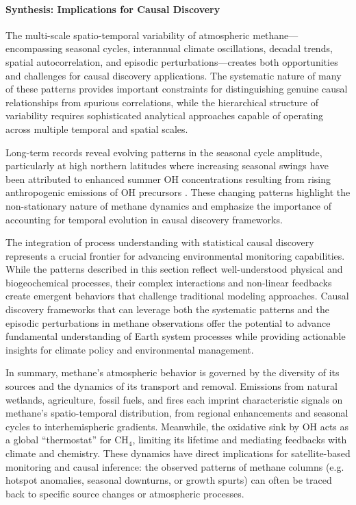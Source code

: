 \paragraph{Synthesis: Implications for Causal Discovery}

The multi-scale spatio-temporal variability of atmospheric methane—encompassing seasonal cycles, interannual climate oscillations, decadal trends, spatial autocorrelation, and episodic perturbations—creates both opportunities and challenges for causal discovery applications. The systematic nature of many of these patterns provides important constraints for distinguishing genuine causal relationships from spurious correlations, while the hierarchical structure of variability requires sophisticated analytical approaches capable of operating across multiple temporal and spatial scales.

Long-term records reveal evolving patterns in the seasonal cycle amplitude, particularly at high northern latitudes where increasing seasonal swings have been attributed to enhanced summer OH concentrations resulting from rising anthropogenic emissions of OH precursors \cite{Karoff2023}. These changing patterns highlight the non-stationary nature of methane dynamics and emphasize the importance of accounting for temporal evolution in causal discovery frameworks.

The integration of process understanding with statistical causal discovery represents a crucial frontier for advancing environmental monitoring capabilities. While the patterns described in this section reflect well-understood physical and biogeochemical processes, their complex interactions and non-linear feedbacks create emergent behaviors that challenge traditional modeling approaches. Causal discovery frameworks that can leverage both the systematic patterns and the episodic perturbations in methane observations offer the potential to advance fundamental understanding of Earth system processes while providing actionable insights for climate policy and environmental management.

In summary, methane's atmospheric behavior is governed by the diversity of its sources and the dynamics of its transport and removal. Emissions from natural wetlands, agriculture, fossil fuels, and fires each imprint characteristic signals on methane's spatio-temporal distribution, from regional enhancements and seasonal cycles to interhemispheric gradients. Meanwhile, the oxidative sink by OH acts as a global ``thermostat'' for CH$_4$, limiting its lifetime and mediating feedbacks with climate and chemistry. These dynamics have direct implications for satellite-based monitoring and causal inference: the observed patterns of methane columns (e.g. hotspot anomalies, seasonal downturns, or growth spurts) can often be traced back to specific source changes or atmospheric processes.


